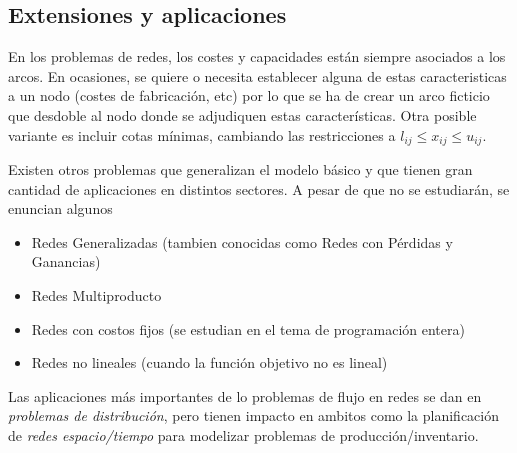 \subsection{Extensiones y aplicaciones}

En los problemas de redes, los costes y capacidades están siempre asociados a los arcos. En ocasiones, se quiere o necesita
establecer alguna de estas caracteristicas a un nodo (costes de fabricación, etc) por lo que se ha de crear un arco ficticio
que desdoble al nodo donde se adjudiquen estas características. Otra posible variante es incluir cotas mínimas, cambiando
las restricciones a $l_{ij}\leq x_{ij}\leq u_{ij}$.

\vspace*{2mm}

Existen otros problemas que generalizan el modelo básico y que tienen gran cantidad de aplicaciones en distintos sectores. A
pesar de que no se estudiarán, se enuncian algunos

\begin{itemize}
    \item Redes Generalizadas (tambien conocidas como Redes con Pérdidas y Ganancias)
    \item Redes Multiproducto
    \item Redes con costos fijos (se estudian en el tema de programación entera)
    \item Redes no lineales (cuando la función objetivo no es lineal)
\end{itemize}

Las aplicaciones más importantes de lo problemas de flujo en redes se dan en \textit{problemas de distribución}, pero tienen
impacto en ambitos como la planificación de \textit{redes espacio/tiempo} para modelizar problemas de producción/inventario.